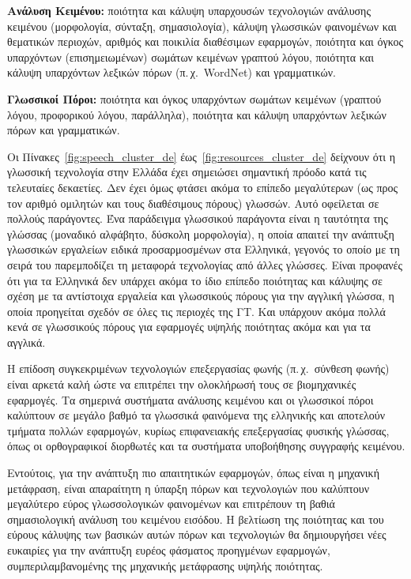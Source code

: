 \documentclass[]{../../metanetpaper}
\begin{document}
\begin{multicols}{2}
\textbf{Ανάλυση Κειμένου:} ποιότητα και κάλυψη υπαρχουσών τεχνολογιών ανάλυσης κειμένου (μορφολογία, σύνταξη, σημασιολογία), κάλυψη γλωσσικών φαινομένων και θεματικών περιοχών, αριθμός και ποικιλία διαθέσιμων εφαρμογών, ποιότητα και όγκος υπαρχόντων (επισημειωμένων) σωμάτων κειμένων γραπτού λόγου, ποιότητα και κάλυψη υπαρχόντων λεξικών πόρων (π.\,χ.~WordNet) και γραμματικών.

\textbf{Γλωσσικοί Πόροι:} ποιότητα και όγκος υπαρχόντων σωμάτων κειμένων (γραπτού λόγου, προφορικού λόγου, παράλληλα), ποιότητα και κάλυψη υπαρχόντων λεξικών πόρων και γραμματικών.

Οι Πίνακες~\ref{fig:speech_cluster_de} έως~\ref{fig:resources_cluster_de} δείχνουν ότι η γλωσσική τεχνολογία στην Ελλάδα έχει σημειώσει σημαντική πρόοδο κατά τις τελευταίες δεκαετίες. Δεν έχει όμως φτάσει ακόμα το επίπεδο μεγαλύτερων (ως προς τον αριθμό ομιλητών και τους διαθέσιμους πόρους) γλωσσών. Αυτό οφείλεται σε πολλούς παράγοντες. Ένα παράδειγμα γλωσσικού παράγοντα είναι η ταυτότητα της γλώσσας (μοναδικό αλφάβητο, δύσκολη μορφολογία), η οποία απαιτεί την ανάπτυξη γλωσσικών εργαλείων ειδικά προσαρμοσμένων στα Ελληνικά, γεγονός το οποίο με τη σειρά του παρεμποδίζει τη μεταφορά τεχνολογίας από άλλες γλώσσες. Είναι προφανές ότι για τα Ελληνικά δεν υπάρχει ακόμα το ίδιο επίπεδο ποιότητας και κάλυψης σε σχέση με τα αντίστοιχα εργαλεία και γλωσσικούς πόρους για την αγγλική γλώσσα, η οποία προηγείται σχεδόν σε όλες τις περιοχές της ΓΤ. Και υπάρχουν ακόμα πολλά κενά σε γλωσσικούς πόρους για εφαρμογές υψηλής ποιότητας ακόμα και για τα αγγλικά.

Η επίδοση συγκεκριμένων τεχνολογιών επεξεργασίας φωνής (π.\,χ.~σύνθεση φωνής) είναι αρκετά καλή ώστε να επιτρέπει την ολοκλήρωσή τους σε βιομηχανικές εφαρμογές. Τα σημερινά συστήματα ανάλυσης κειμένου και οι γλωσσικοί πόροι καλύπτουν σε μεγάλο βαθμό τα γλωσσικά φαινόμενα της ελληνικής και αποτελούν τμήματα πολλών εφαρμογών, κυρίως επιφανειακής επεξεργασίας φυσικής γλώσσας, όπως οι ορθογραφικοί διορθωτές και τα συστήματα υποβοήθησης συγγραφής κειμένου.

Εντούτοις, για την ανάπτυξη πιο απαιτητικών εφαρμογών, όπως είναι η μηχανική μετάφραση, είναι απαραίτητη η ύπαρξη πόρων και τεχνολογιών που καλύπτουν μεγαλύτερο εύρος γλωσσολογικών φαινομένων και επιτρέπουν τη βαθιά σημασιολογική ανάλυση του κειμένου εισόδου. Η βελτίωση της ποιότητας και του εύρους κάλυψης των βασικών αυτών πόρων και τεχνολογιών θα δημιουργήσει νέες ευκαιρίες για την ανάπτυξη ευρέος φάσματος προηγμένων εφαρμογών, συμπεριλαμβανομένης της μηχανικής μετάφρασης υψηλής ποιότητας.


\end{multicols}
\end{document}
